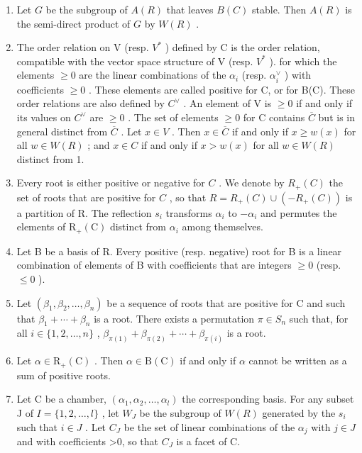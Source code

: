 \begin{enumerate}
\item
  Let \(G\) be the subgroup of \(A(R)\) that leaves \(B(C)\) stable. Then \(A(R)\) is the semi-direct product of \(G\) by \(W(R)\) .
\item
  The order relation on V (resp. \(V^{*}\) ) defined by C is the order relation, compatible with the vector space structure of V (resp. \(V^{*}\) ). for which the elements \(\geqslant 0\) are the linear combinations of the \(\alpha_{i}\) (resp. \(\alpha_{i}^{\vee}\) ) with coefficients \(\geqslant 0\) . These elements are called positive for C, or for B(C). These order relations are also defined by \(C^{\vee}\) . An element of V is \(\geqslant 0\) if and only if its values on \(C^{\vee}\) are \(\geqslant 0\) . The set of elements \(\geqslant 0\) for C contains \(\overline{C}\) but is in general distinct from \(\overline{C}\) . Let \(x \in V\) . Then \(x \in \overline{C}\) if and only if \(x \geqslant w(x)\) for all \(w \in W(R)\) ; and \(x \in C\) if and only if \(x > w(x)\) for all \(w \in W(R)\) distinct from 1.
\item
  Every root is either positive or negative for \(C\) . We denote by \(R_{+}(C)\) the set of roots that are positive for \(C\) , so that \(R = R_{+}(C) \cup (-R_{+}(C))\) is a partition of R. The reflection \(s_{i}\) transforms \(\alpha_{i}\) to \(-\alpha_{i}\) and permutes the elements of \(\mathrm{R}_{+}(\mathrm{C})\) distinct from \(\alpha_{i}\) among themselves.
\item
  Let B be a basis of R. Every positive (resp. negative) root for B is a linear combination of elements of B with coefficients that are integers \(\geqslant 0\) (resp. \(\leqslant 0\) ).
\item
  Let \((\beta_{1},\beta_{2},\ldots,\beta_{n})\) be a sequence of roots that are positive for C and such that \(\beta_{1}+\cdots+\beta_{n}\) is a root. There exists a permutation \(\pi\in S_{n}\) such that, for all \(i\in\{1,2,\ldots,n\}\) , \(\beta_{\pi(1)}+\beta_{\pi(2)}+\cdots+\beta_{\pi(i)}\) is a root.
\item
  Let \(\alpha \in \mathrm{R}_{+}(\mathrm{C})\) . Then \(\alpha \in \mathrm{B}(\mathrm{C})\) if and only if \(\alpha\) cannot be written as a sum of positive roots.
\item
  Let C be a chamber, \((\alpha_{1},\alpha_{2},\ldots,\alpha_{l})\) the corresponding basis. For any subset J of \(I=\{1,2,\ldots,l\}\) , let \(W_{J}\) be the subgroup of \(W(R)\) generated by the \(s_{i}\) such that \(i\in J\) . Let \(C_{J}\) be the set of linear combinations of the \(\alpha_{j}\) with \(j\in J\) and with coefficients \textgreater0, so that \(C_{J}\) is a facet of C.
\end{enumerate}

